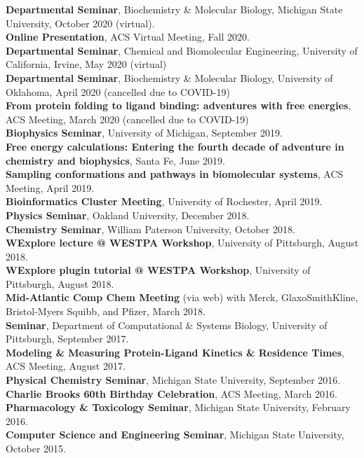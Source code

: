 \documentclass[margin,line]{res}
\begin{document}
\begin{resume}
{\bf Departmental Seminar}, Biochemistry \& Molecular Biology, Michigan State University, October 2020 (virtual).\\
{\bf Online Presentation}, ACS Virtual Meeting, Fall 2020.\\
{\bf Departmental Seminar}, Chemical and Biomolecular Engineering, University of California, Irvine, May 2020 (virtual) \\
{\bf Departmental Seminar}, Biochemistry \& Molecular Biology, University of Oklahoma, April 2020 (cancelled due to COVID-19) \\
{\bf From protein folding to ligand binding: adventures with free energies}, ACS Meeting, March 2020 (cancelled due to COVID-19) \\
{\bf Biophysics Seminar}, University of Michigan, September 2019.\\
{\bf Free energy calculations: Entering the fourth decade of adventure in chemistry and biophysics}, Santa Fe, June 2019.\\
{\bf Sampling conformations and pathways in biomolecular systems}, ACS Meeting, April 2019.\\
{\bf Bioinformatics Cluster Meeting}, University of Rochester, April 2019.\\
{\bf Physics Seminar}, Oakland University, December 2018.\\
{\bf Chemistry Seminar}, William Paterson University, October 2018.\\
{\bf WExplore lecture @ WESTPA Workshop}, University of Pittsburgh, August 2018.\\
{\bf WExplore plugin tutorial @ WESTPA Workshop}, University of Pittsburgh, August 2018.\\
{\bf Mid-Atlantic Comp Chem Meeting} (via web) with Merck, GlaxoSmithKline, Bristol-Myers Squibb, and Pfizer, March 2018. \\
{\bf Seminar}, Department of Computational \& Systems Biology, University of Pittsburgh, September 2017. \\
{\bf Modeling \& Measuring Protein-Ligand Kinetics \& Residence Times}, ACS Meeting, August 2017. \\
{\bf Physical Chemistry Seminar}, Michigan State University, September 2016. \\
{\bf Charlie Brooks 60th Birthday Celebration}, ACS Meeting, March 2016. \\
{\bf Pharmacology \& Toxicology Seminar}, Michigan State University, February 2016. \\
{\bf Computer Science and Engineering Seminar}, Michigan State University, October 2015. \\

\end{resume}
\end{document}
